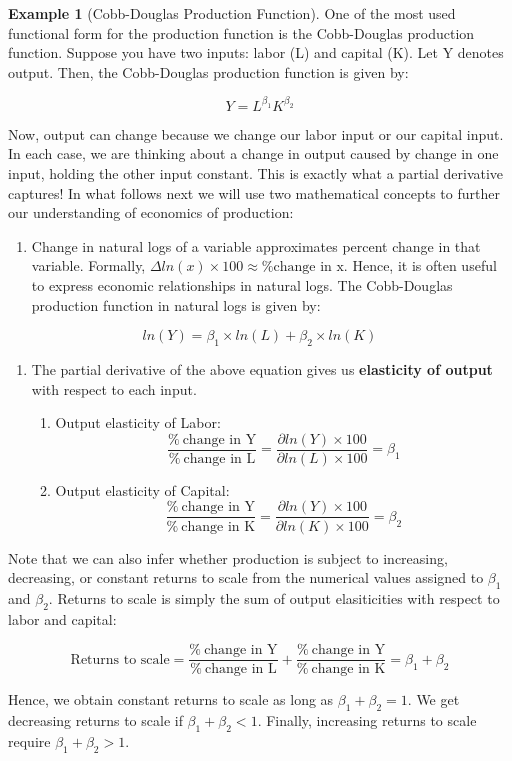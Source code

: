 \documentclass[
]{book}
\providecommand{\tightlist}{%
  \setlength{\itemsep}{0pt}\setlength{\parskip}{0pt}}
\theoremstyle{definition}
\theoremstyle{definition}
\newtheorem{example}{Example}[chapter]
\theoremstyle{definition}
\theoremstyle{definition}
\theoremstyle{remark}
\begin{document}
\begin{example}[Cobb-Douglas Production Function]
\protect\hypertarget{exm:unnamed-chunk-54}{}\label{exm:unnamed-chunk-54}One of the most used functional form for the production function is the Cobb-Douglas production function. Suppose you have two inputs: labor (L) and capital (K). Let Y denotes output. Then, the Cobb-Douglas production function is given by:

\[Y=L^{\beta_1}K^{\beta_2}\]

Now, output can change because we change our labor input or our capital input. In each case, we are thinking about a change in output caused by change in one input, holding the other input constant. This is exactly what a partial derivative captures! In what follows next we will use two mathematical concepts to further our understanding of economics of production:

\begin{enumerate}
\def\labelenumi{\arabic{enumi}.}
\tightlist
\item
  Change in natural logs of a variable approximates percent change in that variable. Formally, \(\Delta ln(x) \times 100 \approx \text{\% change in x}\). Hence, it is often useful to express economic relationships in natural logs. The Cobb-Douglas production function in natural logs is given by:
\end{enumerate}

\[ln(Y)=\beta_1 \times ln(L) + \beta_2 \times ln(K) \]

\begin{enumerate}
\def\labelenumi{\arabic{enumi}.}
\setcounter{enumi}{1}
\item
  The partial derivative of the above equation gives us \textbf{elasticity of output} with respect to each input.

  \begin{enumerate}
  \def\labelenumii{\alph{enumii}.}
  \item
    Output elasticity of Labor:
    \[\frac{\% \ \text{change in Y}}{\% \ \text{change in L}} = \frac{\partial ln(Y) \times 100}{ \partial ln(L) \times 100}=\beta_1\]
  \item
    Output elasticity of Capital:
    \[\frac{\% \ \text{change in Y}}{\% \ \text{change in K}} = \frac{\partial ln(Y) \times 100}{ \partial ln(K) \times 100}=\beta_2\]
  \end{enumerate}
\end{enumerate}

Note that we can also infer whether production is subject to increasing, decreasing, or constant returns to scale from the numerical values assigned to \(\beta_1\) and \(\beta_2\). Returns to scale is simply the sum of output elasiticities with respect to labor and capital:

\[\text{Returns to scale}= \frac{\% \ \text{change in Y}}{\% \  \text{change in L}}+\frac{\% \ \text{change in Y}}{\% \ \text{change in K}}=\beta_1+\beta_2\]

Hence, we obtain constant returns to scale as long as \(\beta_1+\beta_2=1\). We get decreasing returns to scale if \(\beta_1+\beta_2<1\). Finally, increasing returns to scale require \(\beta_1+\beta_2>1\).
\end{example}
\end{document}
